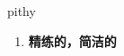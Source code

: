 
\begin{frame}
{\huge pithy}
\begin{center}
\begin{enumerate}\Large
  \item \textbf{精练的，简洁的}
\end{enumerate}
\end{center}
\end{frame}
